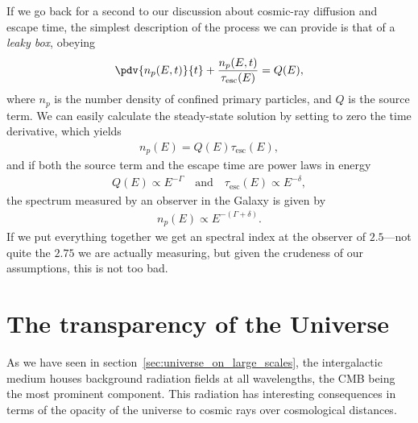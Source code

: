 If we go back for a second to our discussion about cosmic-ray diffusion and escape
time, the simplest description of the process we can provide is that of a
\emph{leaky box}, obeying
\begin{equation}\label{eq:leaky_box}
  \pdv{n_p(E, t)}{t} + \frac{n_p(E, t)}{\tau_\text{esc}(E)} = Q(E),
\end{equation}
where $n_p$ is the number density of confined primary particles, and $Q$ is the source
term.
We can easily calculate the steady-state solution by setting to zero the time
derivative, which yields
\begin{align*}
  n_p(E) = Q(E) \tau_\text{esc}(E),
\end{align*}
and if both the source term and the escape time are power laws in energy
\begin{align*}
  Q(E) \propto E^{-\Gamma} \quad\text{and}\quad \tau_\text{esc}(E) \propto E^{-\delta},
\end{align*}
the spectrum measured by an observer in the Galaxy is given by
\begin{align}
  n_p(E) \propto E^{-(\Gamma + \delta)}.
\end{align}
If we put everything together we get an spectral index at the observer
of $2.5$---not quite the $2.75$ we are actually measuring, but given
the crudeness of our assumptions, this is not too bad.


\section{The transparency of the Universe}

As we have seen in section~\ref{sec:universe_on_large_scales}, the intergalactic
medium houses background radiation fields at all wavelengths, the CMB being the
most prominent component. This radiation has interesting consequences in terms of
the opacity of the universe to cosmic rays over cosmological distances.



